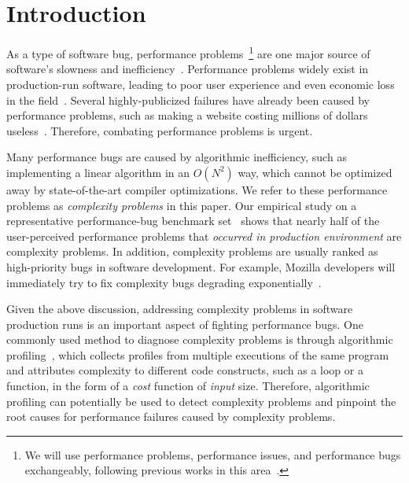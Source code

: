 \section{Introduction}
\label{sec:intro}


As a type of software bug, performance problems~\footnote{We will use performance problems,
performance issues,  and performance bugs exchangeably,
following previous works in this area~\cite{SongOOPSLA2014,ldoctor}.}
are one major source of software's slowness and inefficiency~\cite{PerfBug,perf.fse10,SongOOPSLA2014,ldoctor,Alabama}. 
Performance problems widely exist in production-run software, leading to
poor user experience and  even economic loss in the field~\cite{PerfBug,SongOOPSLA2014,ldoctor}. 
Several highly-publicized failures have already been caused by performance problems,
such as making a website costing millions of dollars useless~\cite{ACA-health}.
Therefore, combating performance problems is urgent.


Many performance bugs are caused by algorithmic inefficiency,
such as implementing a linear algorithm in an $O(N^2)$ way, 
which cannot be optimized away by state-of-the-art 
compiler optimizations. 
We refer to these performance problems as \emph{complexity problems}  in this paper. 
Our empirical study on a representative performance-bug
benchmark set~\cite{PerfBug,SongOOPSLA2014} shows that
nearly half of the user-perceived performance problems that
\emph{occurred in production environment} are complexity problems.
In addition, complexity problems are usually ranked as high-priority bugs in 
software development.  For example, Mozilla developers will immediately try to fix 
complexity bugs degrading exponentially~\cite{mozilla35294}.


Given the above discussion, addressing complexity problems in
software production runs is an important aspect of fighting performance bugs. 
One commonly used method to diagnose complexity problems
is through algorithmic profiling~\cite{Aprof1,Aprof2,AlgoProf},
which collects profiles from multiple
executions of the same program and attributes complexity to different code constructs, 
such as a loop or a function, in the form of a \textit{cost} function of \textit{input} size.
Therefore, algorithmic profiling can potentially be used to detect complexity problems and
pinpoint the root causes for performance failures caused by complexity problems. 


